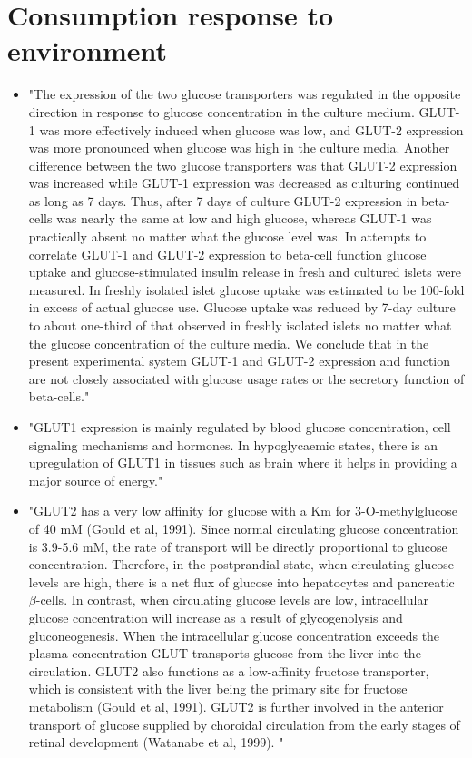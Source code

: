 \documentclass[11pt,a4paper]{article}
\begin{document}
\section{Consumption response to environment}
\begin{itemize}
\item "The expression of the two glucose transporters was regulated in the opposite direction in response to glucose concentration in the culture medium. GLUT-1 was more effectively induced when glucose was low, and GLUT-2 expression was more pronounced when glucose was high in the culture media. Another difference between the two glucose transporters was that GLUT-2 expression was increased while GLUT-1 expression was decreased as culturing continued as long as 7 days. Thus, after 7 days of culture GLUT-2 expression in beta-cells was nearly the same at low and high glucose, whereas GLUT-1 was practically absent no matter what the glucose level was. In attempts to correlate GLUT-1 and GLUT-2 expression to beta-cell function glucose uptake and glucose-stimulated insulin release in fresh and cultured islets were measured. In freshly isolated islet glucose uptake was estimated to be 100-fold in excess of actual glucose use. Glucose uptake was reduced by 7-day culture to about one-third of that observed in freshly isolated islets no matter what the glucose concentration of the culture media. We conclude that in the present experimental system GLUT-1 and GLUT-2 expression and function are not closely associated with glucose usage rates or the secretory function of beta-cells."\cite{Tal1992}
\item "GLUT1 expression is mainly regulated by blood glucose concentration, cell signaling mechanisms and hormones. In hypoglycaemic states, there is an upregulation of GLUT1 in tissues such as brain where it helps in providing a major source of energy."\cite{Pragallapati2019}
\item "GLUT2 has a very low affinity for glucose with a Km for 3-O-methylglucose of 40 mM (Gould et al, 1991). Since normal circulating glucose concentration is 3.9-5.6 mM, the rate of transport will be directly proportional to glucose concentration. Therefore, in the postprandial state, when circulating glucose levels are high, there is a net flux of glucose into hepatocytes and pancreatic $\beta$-cells. In contrast, when circulating glucose levels are low, intracellular glucose concentration will increase as a result of glycogenolysis and gluconeogenesis. When the intracellular glucose concentration exceeds the plasma concentration GLUT transports glucose from the liver into the circulation. GLUT2 also functions as a low-affinity fructose transporter, which is consistent with the liver being the primary site for fructose metabolism (Gould et al, 1991). GLUT2 is further involved in the anterior transport of glucose supplied by choroidal circulation from the early stages of retinal development (Watanabe et al, 1999). "

\end{itemize}
\end{document}
